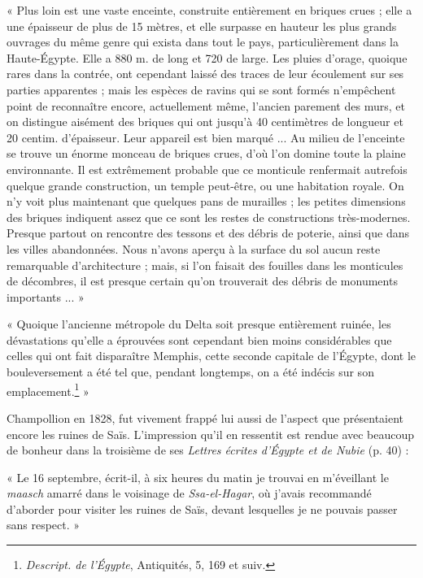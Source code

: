 \documentclass[a4paper, 11pt, oneside]{article}
\begin{document}
« Plus loin est une vaste enceinte, construite entièrement en briques crues ; elle a une épaisseur de plus de 15 mètres, et elle surpasse en hauteur les plus grands ouvrages du même genre qui exista dans tout le pays, particulièrement dans la Haute-Égypte. Elle a 880 m. de long et 720 de large. Les pluies d'orage, quoique rares dans la contrée, ont cependant laissé des traces de leur écoulement sur ses parties apparentes ; mais les espèces de ravins qui se sont formés n'empêchent point de reconnaître encore, actuellement même, l'ancien parement des murs, et on distingue aisément des briques qui ont jusqu'à 40 centimètres de longueur et 20 centim. d'épaisseur. Leur appareil est bien marqué ... Au milieu de l'enceinte se trouve un énorme monceau de briques crues, d'où l'on domine toute la plaine environnante. Il est extrêmement probable que ce monticule renfermait autrefois quelque grande construction, un temple peut-être, ou une habitation royale. On n'y voit plus maintenant que quelques pans de murailles ; les petites dimensions des briques indiquent assez que ce sont les restes de constructions très-modernes. Presque partout on rencontre des tessons et des débris de poterie, ainsi que dans les villes abandonnées. Nous n'avons aperçu à la surface du sol aucun reste remarquable d'architecture ; mais, si l'on faisait des fouilles dans les monticules de décombres, il est presque certain qu'on trouverait des débris de monuments importants ... »

« Quoique l'ancienne métropole du Delta soit presque entièrement ruinée, les dévastations qu'elle a éprouvées sont cependant bien moins considérables que celles qui ont fait disparaître Memphis, cette seconde capitale de l'Égypte, dont le bouleversement a été tel que, pendant longtemps, on a été indécis sur son emplacement.\footnote{\emph{Descript. de l'Égypte}, Antiquités, 5, 169 et suiv.} »

Champollion en 1828, fut vivement frappé lui aussi de l'aspect que présentaient encore les ruines de Saïs. L'impression qu'il en ressentit est rendue avec beaucoup de bonheur dans la troisième de ses \emph{Lettres écrites d'Égypte et de Nubie} (p. 40) :

« Le 16 septembre, écrit-il, à six heures du matin je trouvai en m'éveillant le \emph{maasch} amarré dans le voisinage de \emph{Ssa-el-Hagar}, où j'avais recommandé d'aborder pour visiter les ruines de Saïs, devant lesquelles je ne pouvais passer sans respect. »
\end{document}

